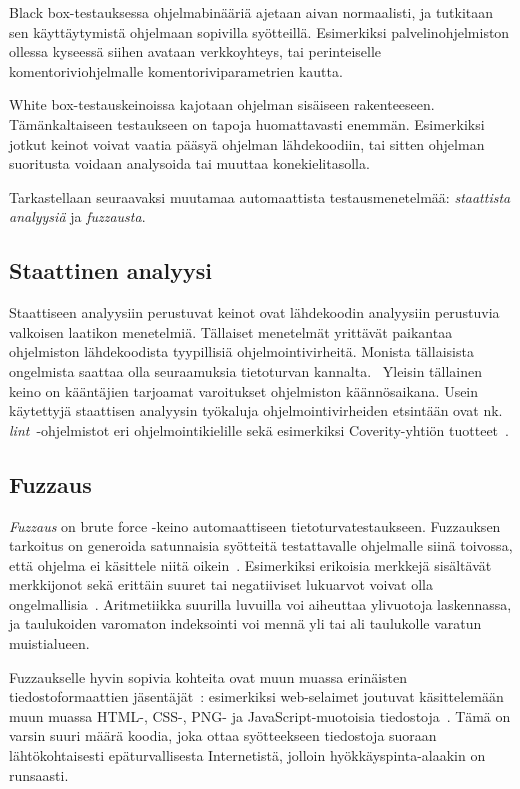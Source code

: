 Black box-testauksessa \fixme[käännökset?] ohjelmabinääriä ajetaan aivan normaalisti,
ja tutkitaan sen käyttäytymistä ohjelmaan sopivilla syötteillä.
Esimerkiksi palvelinohjelmiston ollessa kyseessä siihen avataan verkkoyhteys,
tai perinteiselle komentoriviohjelmalle komentoriviparametrien kautta.

White box-testauskeinoissa kajotaan ohjelman sisäiseen rakenteeseen.
Tämänkaltaiseen testaukseen on tapoja huomattavasti enemmän.
Esimerkiksi jotkut keinot voivat vaatia pääsyä ohjelman lähdekoodiin,
tai sitten ohjelman suoritusta voidaan analysoida tai muuttaa konekielitasolla.

Tarkastellaan seuraavaksi muutamaa automaattista testausmenetelmää: \emph{staattista analyysiä} ja \emph{fuzzausta}.

\subsection{Staattinen analyysi}

Staattiseen analyysiin perustuvat keinot ovat lähdekoodin analyysiin perustuvia valkoisen laatikon menetelmiä.
Tällaiset menetelmät yrittävät paikantaa ohjelmiston lähdekoodista tyypillisiä ohjelmointivirheitä.
Monista tällaisista ongelmista saattaa olla seuraamuksia tietoturvan kannalta.~\cite{StaticCodeAnalysis}
Yleisin tällainen keino on kääntäjien tarjoamat varoitukset ohjelmiston käännösaikana.
Usein käytettyjä staattisen analyysin työkaluja ohjelmointivirheiden etsintään
ovat nk. \emph{lint}~\cite{Lint}-ohjelmistot eri ohjelmointikielille sekä
esimerkiksi Coverity-yhtiön tuotteet~\cite{Coverity}.

\subsection{Fuzzaus}

\emph{Fuzzaus} on brute force -keino automaattiseen tietoturvatestaukseen.
Fuzzauksen tarkoitus on generoida satunnaisia syötteitä testattavalle ohjelmalle siinä toivossa,
että ohjelma ei käsittele niitä oikein~\cite{UnixReliability}.
Esimerkiksi erikoisia merkkejä sisältävät merkkijonot sekä erittäin suuret tai negatiiviset lukuarvot
voivat olla ongelmallisia~\cite{ViolatingAssumptions}.
Aritmetiikka suurilla luvuilla voi aiheuttaa ylivuotoja laskennassa,
ja taulukoiden varomaton indeksointi voi mennä yli tai ali taulukolle varatun muistialueen.

Fuzzaukselle hyvin sopivia kohteita ovat muun muassa erinäisten tiedostoformaattien jäsentäjät~\cite{SageArtikkeli,OuluBrowser}:
esimerkiksi web-selaimet joutuvat käsittelemään muun muassa
HTML-, CSS-, PNG- ja JavaScript-muotoisia tiedostoja~\cite{OuluBrowser}.
Tämä on varsin suuri määrä koodia,
joka ottaa syötteekseen tiedostoja suoraan lähtökohtaisesti epäturvallisesta Internetistä,
jolloin hyökkäyspinta-alaakin on runsaasti.

